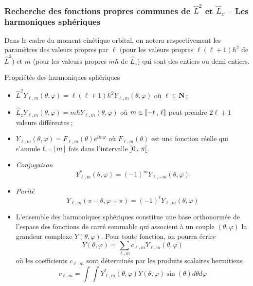         \subsubsection{Recherche des fonctions propres communes de $\hat{L}^2$ et $\hat{L}_z$ -- Les harmoniques sphériques}

        Dans le cadre du moment cinétique orbital, on notera respectivement les paramètres des valeurs propres par $\ell$ (pour les valeurs propres $\ell(\ell + 1) \hbar^2$ de $\hat{L}^2$) et $m$ (pour les valeurs propres $m\hbar$ de $\hat{L}_z$) qui sont des entiers ou demi-entiers. 
        
        \begin{omed}{Propriétés des harmoniques sphériques}
            \begin{itemize}
                \item $\hat{L}^2 Y_{\ell,m}(\theta, \varphi) = \ell(\ell + 1) \hbar^2 Y_{\ell, m} (\theta, \varphi)$ où $\ell \in \mathbf{N}$ ;
                \item $\hat{L}_z Y_{\ell,m}(\theta, \varphi) = m \hbar Y_{\ell, m}(\theta, \varphi)$ où $m \in \left[\!\left[ -\ell \, , \, \ell \right]\!\right]$ peut prendre $2 \ell + 1$ valeurs différentes ;
                \item $Y_{\ell,m}(\theta, \varphi) = F_{\ell, m}(\theta) e^{i m \varphi}$ où $F_{\ell,m}(\theta)$ est une fonction réelle qui s’annule $\ell - \left\lvert \, m \, \right\rvert$ fois dans l’intervalle $\left] 0 \, , \, \pi \right[$.
                \item \textit{Conjugaison}
                \[ Y_{\ell,m}^*(\theta, \varphi) = (-1)^m Y_{\ell,-m}(\theta, \varphi) \]  
                \item \textit{Parité}
                \[ Y_{\ell,m}(\pi - \theta, \varphi + \pi) = (-1)^{\ell} Y_{\ell,m}(\theta, \varphi) \]   
                \item L’ensemble des harmoniques sphériques constitue une base orthonormée de l’espace des fonctions de carré sommable qui associent à un couple $(\theta, \varphi)$ la grandeur complexe $Y(\theta, \varphi)$. Pour toute fonction, on pourra écrire 
                \[ Y(\theta, \varphi) = \sum_{\ell, m} c_{\ell, m} Y_{\ell,m}(\theta, \varphi) \]   
                où les coefficients $c_{\ell, m}$ sont déterminés par les produits scalaires hermitiens 
                \[ c_{\ell,m}= \int \int Y^*_{\ell,m}(\theta, \varphi) Y(\theta, \varphi) \sin(\theta) d\theta d\varphi \]
            \end{itemize}
        \end{omed}

